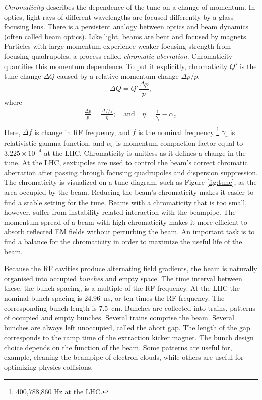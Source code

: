 \emph{Chromaticity} describes the dependence of the tune on a change of momentum.
In optics, light rays of different wavelengths are focused differently by a glass focusing lens.
There is a persistent analogy between optics and beam dynamics (often called beam optics). Like light, beams are bent and focused by magnets. 
Particles with large momentum experience weaker focusing strength from focusing quadrupoles, a process called \emph{chromatic aberration}.
Chromaticity quantifies this momentum dependence.
To put it explicitly, chromaticity $Q'$ is the tune change $\Delta Q$ caused by a relative momentum change $\Delta p/p$. \cite{fuchsberger}
\begin{equation}
    \Delta Q = Q'\frac{\Delta p}{p},
\end{equation}
where
\begin{equation}
\begin{split}
    \frac{\Delta p}{p} = \frac{\Delta f/f}{\eta}; \quad\text{and}\quad \eta = \frac{1}{\gamma_r}-\alpha_c. \\
\end{split}
\end{equation}
Here, $\Delta f$ is change in RF frequency, and $f$ is the nominal frequency \footnote{400,788,860 Hz at the LHC.} 
$\gamma_r$ is relativistic gamma function, and $\alpha_c$ is momentum compaction factor equal to $3.225\times10^{-4}$ at the LHC.
Chromaticity is unitless as it defines a change in the tune.
At the LHC, sextupoles are used to control the beam's correct chromatic aberration after passing through focusing quadrupoles and dispersion suppression. \cite{frascati} \cite{bruno}
The chromaticity is visualized on a tune diagram, such as Figure \ref{fig:tune}, as the area occupied by the beam.
Reducing the beam's chromaticity makes it easier to find a stable setting for the tune.
Beams with a chromaticity that is too small, however, suffer from instability related interaction with the beampipe.
The momentum spread of a beam with high chromaticity makes it more efficient to absorb reflected EM fields without perturbing the beam.
An important task is to find a balance for the chromaticity in order to maximize the useful life of the beam.

Because the RF cavities produce alternating field gradients, the beam is naturally organised into occupied \emph{bunches} and empty space.
The time interval between these, the bunch spacing, is a multiple of the RF frequency.
At the LHC the nominal bunch spacing is 24.96~ns, or ten times the RF frequency. The corresponding bunch length is 7.5~cm. \cite{boussard}
Bunches are collected into trains, patterns of occupied and empty bunches.
Several trains comprise the beam.
Several bunches are always left unoccupied, called the abort gap. The length of the gap corresponds to the ramp time of the extraction kicker magnet.
The bunch design choice depends on the function of the beam. Some patterns are useful for, example, cleaning the beampipe of electron clouds, while others are useful for optimizing physics collisions.

